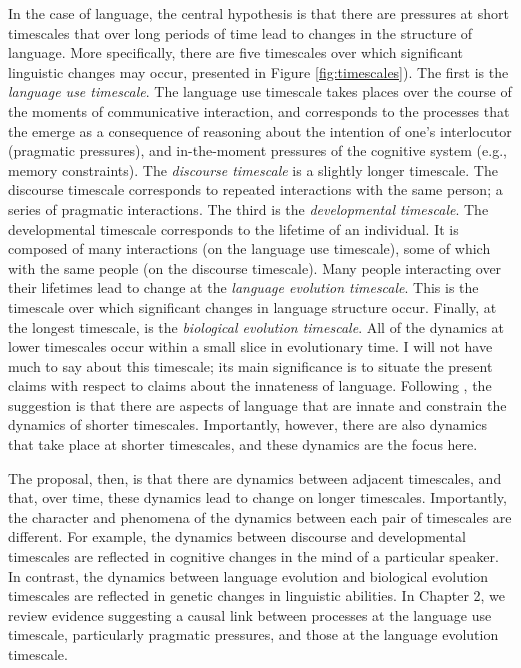 In the case of language, the central  hypothesis is that there are pressures at  short timescales that over long periods of time lead to changes in the structure of language. More specifically,  there are five timescales over which significant linguistic changes may occur, presented in Figure \ref{fig:timescales}). The first is the {\it language use timescale}. The language use timescale takes places over the course of the moments of communicative interaction, and corresponds to the processes  that the emerge as a consequence of reasoning about the intention of one's interlocutor (pragmatic pressures), and in-the-moment pressures of the cognitive system (e.g., memory constraints).  The {\it discourse timescale} is a slightly longer timescale. The discourse timescale corresponds to repeated interactions with the same person; a series of pragmatic interactions. The third is the {\it developmental timescale}. The developmental timescale corresponds to the lifetime of an individual. It is composed of many interactions (on the language use timescale), some of which with the same people (on the discourse timescale).  Many people interacting over their lifetimes lead to change at the {\it language evolution timescale}. This is the timescale over which significant changes in language structure  occur. Finally, at the longest timescale, is the {\it biological evolution timescale}. All of the dynamics at lower timescales occur within a small slice in evolutionary time. I will not have much to say about this timescale; its main significance is to situate the present claims with respect to claims about the innateness of language. Following , the suggestion is that there are aspects of language that are innate and constrain the dynamics of shorter timescales. Importantly, however, there are also  dynamics that take place at  shorter timescales, and these dynamics are the focus here.




The proposal, then, is that there are dynamics between adjacent timescales, and that, over time, these dynamics lead to change on longer timescales.  Importantly, the character and phenomena of the dynamics between each pair of timescales are different. For example,  the dynamics between discourse and developmental timescales are reflected in cognitive changes in the mind of a particular speaker. In contrast, the dynamics between language evolution and biological evolution timescales are reflected in genetic changes in linguistic abilities. In Chapter 2, we review evidence suggesting a causal link between processes at the language use timescale, particularly pragmatic pressures, and those at the language evolution timescale.

